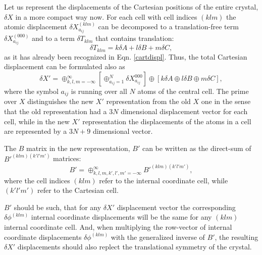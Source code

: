 \documentclass[prl,aps,preprint,superbib,12pt]{revtex4}
\begin{document}
Let us represent the displacements of the Cartesian
positions of the entire crystal, $\delta X$ in a more
compact way now. For each cell with cell indices
$(klm)$ the atomic displacement $\delta X^{(klm)}_{a_{ij}}$
can be decomposed to a translation-free term 
$\delta X^{(000)}_{a_{ij}}$ and to a term $\delta T_{klm}$ that
contains translation:
\begin{equation}
\delta T_{klm} = k \delta A + l \delta B + m \delta C ,
\end{equation}
as it has already been recognized in Eqn. \ref{cartdispl}.
Thus, the total Cartesian displacement can be formulated also as
\begin{equation} \label{newx}
\delta X' = 
\oplus_{k,l,m=-\infty}^{\infty}
\left[ \oplus_{a_{ij}=1}^{N} \delta X^{000}_{a_{ij}} \right]
\oplus
\left[ 
 k \delta A \oplus l \delta B \oplus m \delta C \right] ,
\end{equation}
where the symbol $a_{ij}$ is running over all $N$ atoms
of the central cell. The prime over $X$ distinguishes
the new $X'$ representation from the old $X$ one in the sense
that the old representation had a $3N$ dimensional displacement
vector for each cell, while in the new $X'$ representation
the displacements of the atoms in a cell are represented by
a $3N+9$ dimensional vector.

The $B$ matrix in the new representation, $B'$ can be written
as the direct-sum of $B'^{(klm)(k'l'm')}$ matrices:
\begin{equation}
B' = \oplus_{k,l,m,k',l',m'=-\infty}^{\infty} B'^{(klm)(k'l'm')} ,
\end{equation}
where the cell indices $(klm)$ refer to the internal coordinate
cell, while $(k'l'm')$ refer to the Cartesian cell.

$B'$ should be such, that for any $\delta X'$ displacement vector
the corresponding $\delta \phi^{(klm)}$ internal coordinate
displacements will be the same for any $(klm)$ internal coordinate
cell. And, when multiplying the row-vector of internal coordinate 
displacements $\delta \phi^{(klm)}$ with the generalized inverse
of $B'$, the resulting $\delta X'$ displacements should also
replect the translational symmetry of the crystal.
\end{document}
